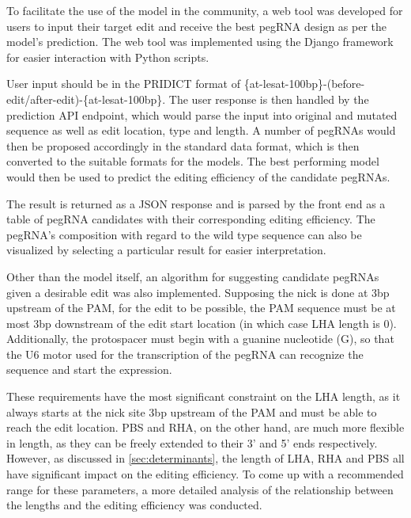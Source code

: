 To facilitate the use of the model in the community, a web tool was developed for users to input their target edit and receive the best pegRNA design as per the model's prediction. The web tool was implemented using the Django framework for easier interaction with Python scripts. 

User input should be in the PRIDICT format of \{at-lesat-100bp\}-(before-edit/after-edit)-\{at-lesat-100bp\}. The user response is then handled by the prediction API endpoint, which would parse the input into original and mutated sequence as well as edit location, type and length. A number of pegRNAs would then be proposed accordingly in the standard data format, which is then converted to the suitable formats for the models. The best performing model would then be used to predict the editing efficiency of the candidate pegRNAs. 


The result is returned as a JSON response and is parsed by the front end as a table of pegRNA candidates with their corresponding editing efficiency. The pegRNA's composition with regard to the wild type sequence can also be visualized by selecting a particular result for easier interpretation.

Other than the model itself, an algorithm for suggesting candidate pegRNAs given a desirable edit was also implemented. Supposing the nick is done at 3bp upstream of the PAM, for the edit to be possible, the PAM sequence must be at most 3bp downstream of the edit start location (in which case LHA length is 0). Additionally, the protospacer must begin with a guanine nucleotide (G), so that the U6 motor used for the transcription of the pegRNA can recognize the sequence and start the expression\cite{hsieh-fengEfficientExpressionMultiple2020}.

These requirements have the most significant constraint on the LHA length, as it always starts at the nick site 3bp upstream of the PAM and must be able to reach the edit location. PBS and RHA, on the other hand, are much more flexible in length, as they can be freely extended to their 3' and 5' ends respectively.
However, as discussed in \autoref{sec:determinants}, the length of LHA, RHA and PBS all have significant impact on the editing efficiency. To come up with a recommended range for these parameters, a more detailed analysis of the relationship between the lengths and the editing efficiency was conducted.

